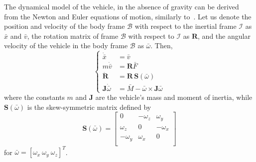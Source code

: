 The dynamical model of the vehicle, in the absence of gravity can be
derived from the Newton and Euler equations of motion, similarly
to~\cite{mahony12}. Let us denote the position and velocity of the
body frame $\mathcal{B}$ with respect to the inertial frame
$\mathcal{I}$ as $\bar{x}$ and $\bar{v}$, the rotation matrix of frame
$\mathcal{B}$ with respect to $\mathcal{I}$ as $\mathbf{R}$, and the
angular velocity of the vehicle in the body frame $\mathcal{B}$ as
$\bar{\omega}$. Then,
\begin{equation}
  \label{eq:dynsys}
  \left\{
    \begin{aligned}
      \dot{\bar{x}} &= \bar{v} \\
      m \dot{\bar{v}} &= \mathbf{R} \bar{F} \\
      \dot{\mathbf{R}} &= \mathbf{R}\,\mathbf{S}(\bar{\omega}) \\
      \mathbf{J} \dot{\bar{\omega}} &= \bar{M} - \bar{\omega}\times\mathbf{J} \bar{\omega}
    \end{aligned}
  \right.
\end{equation}
where the constants $m$ and $\mathbf{J}$
are the vehicle's mass and moment of inertia, while
$\mathbf{S}(\bar{\omega})$ is the skew-symmetric matrix defined by
\begin{equation}
  \label{eq:S}
  \mathbf{S}(\bar{\omega}) =
  \left[
    \begin{array}{ccc}
      0 & -\omega_z & \omega_y \\
      \omega_z & 0 & -\omega_x \\
      -\omega_y & \omega_x & 0 \\
    \end{array}
  \right]
\end{equation}
for $\bar{\omega}=[\omega_x\:\omega_y\:\omega_z]^T$.


